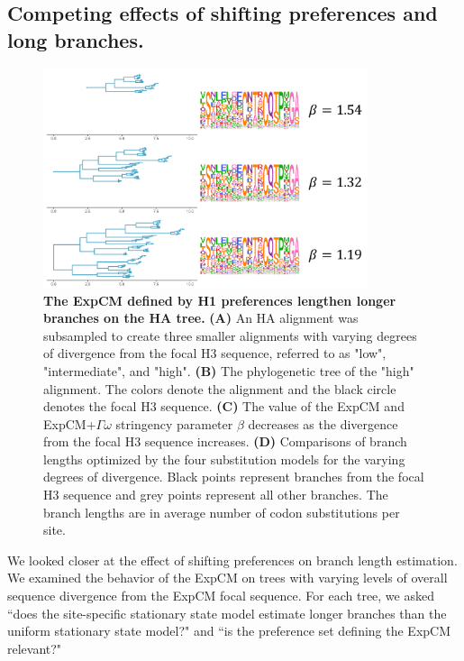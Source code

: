 \documentclass[11pt]{article}
\begin{document}
\subsection*{Competing effects of shifting preferences and long branches.}

\begin{figure}[H]
\centerline{\includegraphics[width=0.85\textwidth]{figures/doud_compete_2}}
\caption{\label{fig:doud_compete}
\textbf{The ExpCM defined by H1 preferences lengthen longer branches on the HA tree.} 
\textbf{(A)} An HA alignment was subsampled to create three smaller alignments with varying degrees of divergence from the focal H3 sequence, referred to as "low", "intermediate", and "high". 
\textbf{(B)} The phylogenetic tree of the "high" alignment. 
The colors denote the alignment and the black circle denotes the focal H3 sequence. 
\textbf{(C)} The value of the ExpCM and ExpCM+$\Gamma\omega$ stringency parameter $\beta$ decreases as the divergence from the focal H3 sequence increases. 
\textbf{(D)} Comparisons of branch lengths optimized by the four substitution models for the varying degrees of divergence. 
Black points represent branches from the focal H3 sequence and grey points represent all other branches.  
The branch lengths are in average number of codon substitutions per site. 
}
\end{figure}

We looked closer at the effect of shifting preferences on branch length estimation. 
We examined the behavior of the ExpCM on trees with varying levels of overall sequence divergence from the ExpCM focal sequence. 
For each tree, we asked ``does the site-specific stationary state model estimate longer branches than the uniform stationary state model?" and ``is the preference set defining the ExpCM relevant?"
\end{document}
